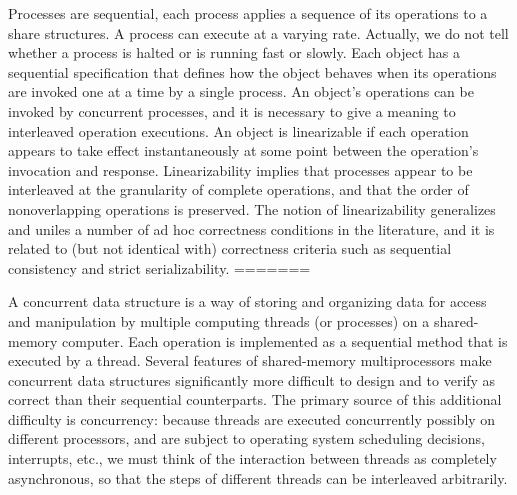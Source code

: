 Processes are sequential, each process applies a sequence of its operations to a share structures. A process can execute at a varying rate. Actually, we do not tell whether a process is halted or is running fast or slowly. Each object has a sequential specification that defines how the object behaves when its operations are
invoked one at a time by a single process. An object’s operations can be invoked by concurrent
processes, and it is necessary to give a meaning to interleaved operation
executions.
An object is linearizable if each operation appears
to take effect instantaneously at some point between the operation’s invocation
and response. Linearizability implies that processes appear to be interleaved
at the granularity of complete operations, and that the order of
nonoverlapping operations is preserved. The notion of linearizability generalizes and uniles a number of ad hoc correctness conditions in the literature, and it is related to (but not identical with) correctness criteria such as sequential consistency and strict serializability.
=======

A concurrent data structure is a way of storing and organizing data for access and manipulation by multiple computing threads (or processes) on a shared-memory computer. Each operation is implemented as a sequential
method that is executed by a thread. Several features of shared-memory multiprocessors make concurrent data structures significantly more difficult to design and to verify as correct than their sequential counterparts. The primary source of this additional difficulty is concurrency: because threads are executed concurrently possibly on different processors, and are subject to operating system scheduling decisions, interrupts, etc., we must think of the interaction between threads as completely asynchronous, so that the steps of different threads can be interleaved arbitrarily. %




